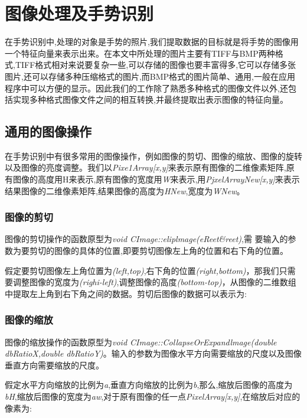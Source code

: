 \documentclass{XDBAthesis}
\begin{document}
\else
\fi
\chapter{图像处理及手势识别}

在手势识别中,处理的对象是手势的照片,我们提取数据的目标就是将手势的图像用一个特征向量来表示出来。在本文中所处理的图片主要有TIFF与BMP两种格式,TIFF格式相对来说要复杂一些,可以存储的图像也要丰富得多,它可以存储多张图片,还可以存储多种压缩格式的图片,而BMP格式的图片简单、通用,一般在应用程序中可以方便的显示。因此我们的工作除了熟悉多种格式的图像文件以外,还包括实现多种格式图像文件之间的相互转换,并最终提取出表示图像的特征向量。

\section{通用的图像操作}

    在手势识别中有很多常用的图像操作，例如图像的剪切、图像的缩放、图像的旋转以及图像的亮度调整。我们以\emph{Pixe1Array[x,y]}来表示原有图像的二维像素矩阵,原有图像的高度用H来表示,原有图像的宽度用\emph{W}来表示,用\emph{PjxelArrayNew[x,y]}来表示结果图像的二维像素矩阵,结果图像的高度为\emph{HNew},宽度为\emph{WNew}。

\subsection{图像的剪切}

    图像的剪切操作的函数原型为\emph{void CImage::eliplmage(eReet\&reet)},需
要输入的参数为要剪切的图像的具体的位置,即要剪切图像左上角的位置和右下角的位置。

假定要剪切图像左上角位置为\emph{(left,top)},右下角的位置\emph{(right,bottom)}，那我们只需要调整图像的宽度为\emph{(righi-left)},调整图像的高度\emph{(bottom-top)}，从图像的二维数组中提取左上角到右下角之间的数据。剪切后图像的数据可以表示为:



\subsection{图像的缩放}

    图像的缩放操作的函数原型为\emph{void CImage::CollapseOrExpandlmage(double dbRatioX,double dbRatioY)}。输入的参数为图像水平方向需要缩放的尺度以及图像垂直方向需要缩放的尺度。

假定水平方向缩放的比例为\emph{a},垂直方向缩放的比例为\emph{b},那么,缩放后图像的高度为\emph{bH},缩放后图像的宽度为\emph{aw},对于原有图像的任一点\emph{PixelArray[x,y]},在缩放后对应的像素为:
\end{document}
